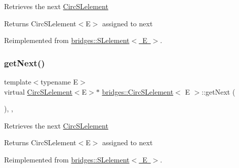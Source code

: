 Retrieves the next \mbox{\hyperlink{classbridges_1_1_circ_s_lelement}{Circ\+S\+Lelement}} \begin{DoxyReturn}{Returns}
Circ\+S\+Lelement$<$\+E$>$ assigned to next 
\end{DoxyReturn}


Reimplemented from \mbox{\hyperlink{classbridges_1_1_s_lelement_a5bd74108a9aa49339378bf62cdbb19ca}{bridges\+::\+S\+Lelement$<$ E $>$}}.

\mbox{\label{classbridges_1_1_circ_s_lelement_aab863627c125c6f1075af7e7b7f340cf}} 
\subsubsection{\texorpdfstring{get\+Next()}{getNext()}\hspace{0.1cm}{\footnotesize\ttfamily [2/2]}}
{\footnotesize\ttfamily template$<$typename E$>$ \\
virtual \mbox{\hyperlink{classbridges_1_1_circ_s_lelement}{Circ\+S\+Lelement}}$<$E$>$$\ast$ \mbox{\hyperlink{classbridges_1_1_circ_s_lelement}{bridges\+::\+Circ\+S\+Lelement}}$<$ E $>$\+::get\+Next (\begin{DoxyParamCaption}{ }\end{DoxyParamCaption})\hspace{0.3cm}{\ttfamily [inline]}, {\ttfamily [override]}, {\ttfamily [virtual]}}

Retrieves the next \mbox{\hyperlink{classbridges_1_1_circ_s_lelement}{Circ\+S\+Lelement}} \begin{DoxyReturn}{Returns}
Circ\+S\+Lelement$<$\+E$>$ assigned to next 
\end{DoxyReturn}


Reimplemented from \mbox{\hyperlink{classbridges_1_1_s_lelement_a5bd74108a9aa49339378bf62cdbb19ca}{bridges\+::\+S\+Lelement$<$ E $>$}}.

\mbox{\label{classbridges_1_1_circ_s_lelement_a7b2512dd1cc559f0a89d9ab4aafed172}} 
